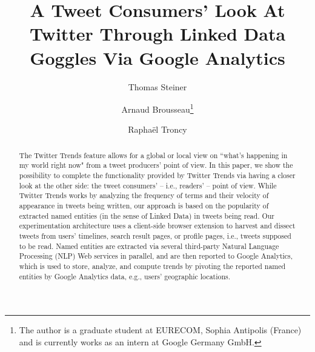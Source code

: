 \documentclass[runningheads,a4paper]{llncs}
\begin{document}
\mainmatter  %

\title{A Tweet Consumers' Look At Twitter Through Linked Data Goggles Via Google Analytics}


%
%
\author{Thomas Steiner \and Arnaud Brousseau\thanks{The author is a graduate student at EURECOM, Sophia Antipolis (France) and
is currently works as an intern at Google Germany GmbH.} \and Rapha\"{e}l Troncy}


%
%


\maketitle

\begin{abstract}
The Twitter Trends feature allows for a global or local view on ``what's happening in my world right now" from a tweet producers' point of view. In this paper, we show the possibility to complete the functionality provided by Twitter Trends via having a closer look at the other side: the tweet consumers' -- i.e., readers' -- point of view. While Twitter Trends works by analyzing the frequency of terms and their velocity of appearance in tweets being written, our approach is based on the popularity of extracted named entities (in the sense of Linked Data) in tweets being read. Our experimentation architecture uses a client-side browser extension to harvest and dissect tweets from users' timelines, search result pages, or profile pages, i.e., tweets supposed to be read. Named entities are extracted via several third-party Natural Language Processing (NLP) Web services in parallel, and are then reported to Google Analytics, which is used to store, analyze, and compute trends by pivoting the reported named entities by Google Analytics data, e.g., users' geographic locations.
\end{abstract}
\end{document}
